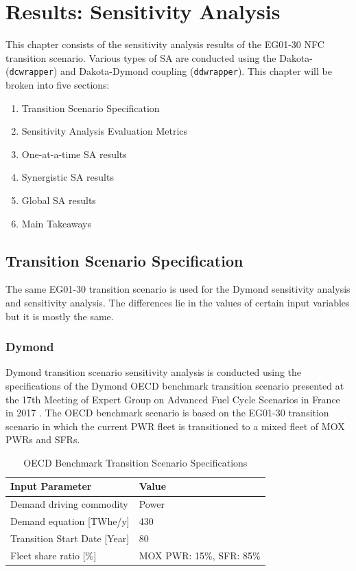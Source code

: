 \chapter{Results: Sensitivity Analysis}
This chapter consists of the sensitivity analysis results of the 
EG01-30 \gls{NFC} transition scenario. 
Various types of \gls{SA} are conducted
using the Dakota-\Cyclus (\texttt{dcwrapper}) 
and Dakota-Dymond coupling (\texttt{ddwrapper}). 
This chapter will be broken into five sections: 
\begin{enumerate}
    \item Transition Scenario Specification 
    \item Sensitivity Analysis Evaluation Metrics 
    \item One-at-a-time \gls{SA} results 
    \item Synergistic \gls{SA} results
    \item Global \gls{SA} results 
    \item Main Takeaways 
\end{enumerate}

\section{Transition Scenario Specification}
The same EG01-30 transition scenario is used for the Dymond 
sensitivity analysis and \Cyclus sensitivity analysis. 
The differences lie in the values of certain input variables but 
it is mostly the same. 

\subsection{Dymond}
Dymond transition scenario sensitivity analysis is conducted 
using the specifications of the Dymond OECD benchmark transition 
scenario presented at the 17th Meeting of Expert Group on Advanced 
Fuel Cycle Scenarios in France in 2017 
\cite{oecd_nuclear_energy_agency_wpfc_nodate}. 
The OECD benchmark scenario is based on the EG01-30 transition scenario in which 
the current \gls{PWR} fleet is transitioned to
a mixed fleet of \gls{MOX} \glspl{PWR} and \glspl{SFR}. 


\begin{table}[H]
    \caption{OECD Benchmark Transition Scenario
	Specifications \cite{oecd_nuclear_energy_agency_wpfc_nodate}}
	\label{tab:dymondinputs}
    \footnotesize
    \begin{tabularx}{\textwidth}{LL}
    \hline
                               \textbf{Input Parameter}            & \textbf{Value}            \\ \hline
    Demand driving commodity   & Power              \\
                               Demand equation {[}TWhe/y{]}   & 430        \\
                               Transition Start Date [Year] & 80\\ 
                               Fleet share ratio [\%] & \gls{MOX} \gls{PWR}: 15\%, \gls{SFR}: 85\%\\ \hline
    \end{tabularx}%
    \end{table}

